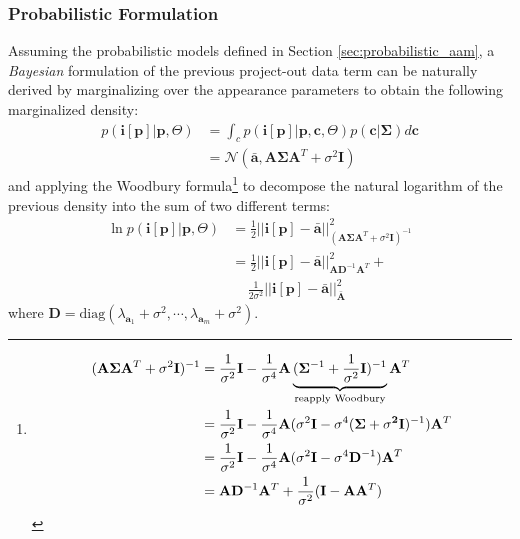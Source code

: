 \subsubsection*{Probabilistic Formulation}
\label{sec:po_pi}
Assuming the probabilistic models defined in Section \ref{sec:probabilistic_aam}, a \emph{Bayesian} formulation of the previous project-out data term can be naturally derived by marginalizing over the appearance parameters to obtain the following marginalized density:
\begin{equation}
    \begin{aligned}
        p(\mathbf{i}[\mathbf{p}] | \mathbf{p}, \Theta) & = \int_c p(\mathbf{i}[\mathbf{p}] | \mathbf{p}, \mathbf{c}, \Theta) p(\mathbf{c}|\mathbf{\Sigma}) d\mathbf{c} 
        \\
        & = \mathcal{N}(\bar{\mathbf{a}}, \mathbf{A}\mathbf{\Sigma}\mathbf{A}^T + \sigma^2 \mathbf{I})
    \end{aligned}
    \label{eq:marginal}
\end{equation}
and applying the Woodbury formula\footnote{
\begin{equation*}
    \begin{aligned}
    \small
    	(\mathbf{A} \mathbf{\Sigma} \mathbf{A}^T + \sigma^2 \mathbf{I})^{-1} & = \frac{1}{\sigma^2} \mathbf{I} - \frac{1}{\sigma^4} \mathbf{A} \underbrace{(\mathbf{\Sigma}^{-1} + \frac{1}{\sigma^2}\mathbf{I})^{-1}}_{\textrm{reapply Woodbury}} \mathbf{A}^T
    	\\
    	& = \frac{1}{\sigma^2} \mathbf{I} - \frac{1}{\sigma^4} \mathbf{A} (\sigma^2\mathbf{I} - \sigma^4(\mathbf{\Sigma + \sigma^2\mathbf{I}})^{-1}) \mathbf{A}^T
    	\\
    	& = \frac{1}{\sigma^2} \mathbf{I} - \frac{1}{\sigma^4} \mathbf{A} (\sigma^2\mathbf{I} - \sigma^4\mathbf{D}^{-1}) \mathbf{A}^T
    	\\
    	& = \mathbf{A}\mathbf{D}^{-1}\mathbf{A}^T + \frac{1}{\sigma^2} (\mathbf{I} - \mathbf{A}\mathbf{A}^T)
    \end{aligned}
    \label{eq:woodbury}
\end{equation*}} \cite{Woodbury1950} to decompose the natural logarithm of the previous density into the sum of two different terms:
\begin{equation}
    \begin{aligned}
        \ln p(\mathbf{i}[\mathbf{p}] | \mathbf{p}, \Theta) & = \frac{1}{2}|| \mathbf{i}[\mathbf{p}] - \mathbf{\bar{a}} ||^2_{(\mathbf{A}\mathbf{\Sigma}\mathbf{A}^T + \sigma^2 \mathbf{I})^{-1}}
        \\
        & = \frac{1}{2}|| \mathbf{i}[\mathbf{p}] - \mathbf{\bar{a}} ||^2_{\mathbf{A}\mathbf{D}^{-1}\mathbf{A}^T} + 
        \\
        & \quad \, \frac{1}{2\sigma^2}|| \mathbf{i}[\mathbf{p}] - \mathbf{\bar{a}} ||^2_{\bar{\mathbf{A}}}
    \end{aligned}
    \label{eq:prob_po}
\end{equation}
where $\mathbf{D} = \textrm{diag}(\lambda_{\mathbf{a}_1} + \sigma^2, \cdots, \lambda_{\mathbf{a}_m} + \sigma^2)$.

